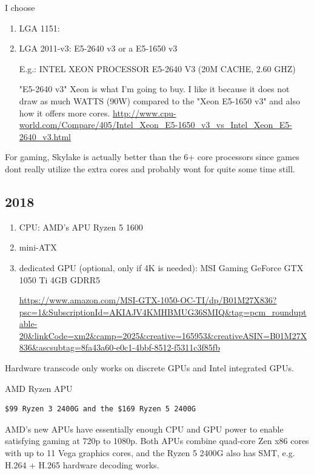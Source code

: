 I choose
\begin{enumerate}
  \item LGA 1151: 
  
  \item LGA 2011-v3:  E5-2640 v3 or a E5-1650 v3
  
  E.g.: INTEL XEON PROCESSOR E5-2640 V3 (20M CACHE, 2.60 GHZ)
  
  "E5-2640 v3" Xeon is what I'm going to buy. I like it because it does not draw
  as much WATTS (90W) compared to the "Xeon E5-1650 v3" and also how it offers more
  cores.
  \url{http://www.cpu-world.com/Compare/405/Intel_Xeon_E5-1650_v3_vs_Intel_Xeon_E5-2640_v3.html}
  
\end{enumerate}


For gaming, Skylake is actually better than the 6+ core processors since games
dont really utilize the extra cores and probably wont for quite some time still.


\subsection{2018}

\begin{enumerate}
  
  \item CPU: AMD's APU Ryzen 5 1600
  
  \item mini-ATX
  
  
  \item dedicated GPU (optional, only if 4K is needed): MSI Gaming GeForce GTX 1050 Ti 4GB GDRR5 
  
  \url{https://www.amazon.com/MSI-GTX-1050-OC-TI/dp/B01M27X836?psc=1&SubscriptionId=AKIAJV4KMHBMUG36SMIQ&tag=pcm_rounduptable-20&linkCode=xm2&camp=2025&creative=165953&creativeASIN=B01M27X836&ascsubtag=8fa43a60-e0c1-4bbf-8512-f5311c3f85fb} 
\end{enumerate}


Hardware transcode only works on discrete GPUs and Intel integrated GPUs.

AMD Ryzen APU 
\begin{verbatim}
$99 Ryzen 3 2400G and the $169 Ryzen 5 2400G
\end{verbatim}

AMD's new APUs have essentially enough CPU and GPU power to enable satisfying
gaming at 720p to 1080p. Both APUs combine quad-core Zen x86 cores with up to 11
Vega graphics cores, and the Ryzen 5 2400G also has SMT, e.g. H.264 + H.265
hardware decoding works.

